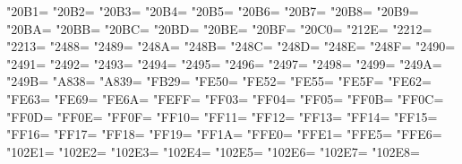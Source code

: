 \XeTeXcharclass"20B1=\KclassNum
\XeTeXcharclass"20B2=\KclassNum
\XeTeXcharclass"20B3=\KclassNum
\XeTeXcharclass"20B4=\KclassNum
\XeTeXcharclass"20B5=\KclassNum
\XeTeXcharclass"20B6=\KclassNum
\XeTeXcharclass"20B7=\KclassNum
\XeTeXcharclass"20B8=\KclassNum
\XeTeXcharclass"20B9=\KclassNum
\XeTeXcharclass"20BA=\KclassNum
\XeTeXcharclass"20BB=\KclassNum
\XeTeXcharclass"20BC=\KclassNum
\XeTeXcharclass"20BD=\KclassNum
\XeTeXcharclass"20BE=\KclassNum
\XeTeXcharclass"20BF=\KclassNum
\XeTeXcharclass"20C0=\KclassNum
\XeTeXcharclass"212E=\KclassNum
\XeTeXcharclass"2212=\KclassNum
\XeTeXcharclass"2213=\KclassNum
\XeTeXcharclass"2488=\KclassNum
\XeTeXcharclass"2489=\KclassNum
\XeTeXcharclass"248A=\KclassNum
\XeTeXcharclass"248B=\KclassNum
\XeTeXcharclass"248C=\KclassNum
\XeTeXcharclass"248D=\KclassNum
\XeTeXcharclass"248E=\KclassNum
\XeTeXcharclass"248F=\KclassNum
\XeTeXcharclass"2490=\KclassNum
\XeTeXcharclass"2491=\KclassNum
\XeTeXcharclass"2492=\KclassNum
\XeTeXcharclass"2493=\KclassNum
\XeTeXcharclass"2494=\KclassNum
\XeTeXcharclass"2495=\KclassNum
\XeTeXcharclass"2496=\KclassNum
\XeTeXcharclass"2497=\KclassNum
\XeTeXcharclass"2498=\KclassNum
\XeTeXcharclass"2499=\KclassNum
\XeTeXcharclass"249A=\KclassNum
\XeTeXcharclass"249B=\KclassNum
\XeTeXcharclass"A838=\KclassNum
\XeTeXcharclass"A839=\KclassNum
\XeTeXcharclass"FB29=\KclassNum
\XeTeXcharclass"FE50=\KclassNum
\XeTeXcharclass"FE52=\KclassNum
\XeTeXcharclass"FE55=\KclassNum
\XeTeXcharclass"FE5F=\KclassNum
\XeTeXcharclass"FE62=\KclassNum
\XeTeXcharclass"FE63=\KclassNum
\XeTeXcharclass"FE69=\KclassNum
\XeTeXcharclass"FE6A=\KclassNum
\XeTeXcharclass"FEFF=\KclassNum
\XeTeXcharclass"FF03=\KclassNum
\XeTeXcharclass"FF04=\KclassNum
\XeTeXcharclass"FF05=\KclassNum
\XeTeXcharclass"FF0B=\KclassNum
\XeTeXcharclass"FF0C=\KclassNum
\XeTeXcharclass"FF0D=\KclassNum
\XeTeXcharclass"FF0E=\KclassNum
\XeTeXcharclass"FF0F=\KclassNum
\XeTeXcharclass"FF10=\KclassNum
\XeTeXcharclass"FF11=\KclassNum
\XeTeXcharclass"FF12=\KclassNum
\XeTeXcharclass"FF13=\KclassNum
\XeTeXcharclass"FF14=\KclassNum
\XeTeXcharclass"FF15=\KclassNum
\XeTeXcharclass"FF16=\KclassNum
\XeTeXcharclass"FF17=\KclassNum
\XeTeXcharclass"FF18=\KclassNum
\XeTeXcharclass"FF19=\KclassNum
\XeTeXcharclass"FF1A=\KclassNum
\XeTeXcharclass"FFE0=\KclassNum
\XeTeXcharclass"FFE1=\KclassNum
\XeTeXcharclass"FFE5=\KclassNum
\XeTeXcharclass"FFE6=\KclassNum
\XeTeXcharclass"102E1=\KclassNum
\XeTeXcharclass"102E2=\KclassNum
\XeTeXcharclass"102E3=\KclassNum
\XeTeXcharclass"102E4=\KclassNum
\XeTeXcharclass"102E5=\KclassNum
\XeTeXcharclass"102E6=\KclassNum
\XeTeXcharclass"102E7=\KclassNum
\XeTeXcharclass"102E8=\KclassNum
